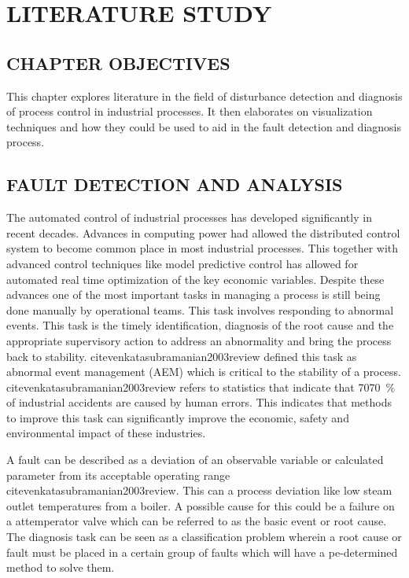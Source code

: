 
\chapter{LITERATURE STUDY}

\section{CHAPTER OBJECTIVES}

This chapter explores literature in the field of disturbance detection and diagnosis of process control in industrial processes. It then elaborates on visualization techniques and how they could be used to aid in the fault detection and diagnosis process.

\section{FAULT DETECTION AND ANALYSIS}

The automated control of industrial processes has developed significantly in recent decades. Advances in computing power had allowed the distributed control system to become common place in most industrial processes. This together with advanced control techniques like model predictive control has allowed for automated real time optimization of the key economic variables. Despite these advances one of the most important tasks in managing a process is still being done manually by operational teams. This task involves responding to abnormal events. This task is the timely identification, diagnosis of the root cause and the appropriate supervisory action to address an abnormality and bring the process back to stability. cite{venkatasubramanian2003review} defined this task as abnormal event management (AEM) which is critical to the stability of a process. cite{venkatasubramanian2003review} refers to statistics that indicate that 70\SI{70}{\percent} of industrial accidents are caused by human errors. This indicates that methods to improve this task can significantly improve the economic, safety and environmental impact of these industries.

A fault can be described as a deviation of an observable variable or calculated parameter from its acceptable operating range cite{venkatasubramanian2003review}. This can a process deviation like low steam outlet temperatures from a boiler. A possible cause for this could be a failure on a attemperator valve which can be referred to as the basic event or root cause. The diagnosis task can be seen as a classification problem wherein a root cause or fault must be placed in a certain group of faults which will have a pe-determined method to solve them.

